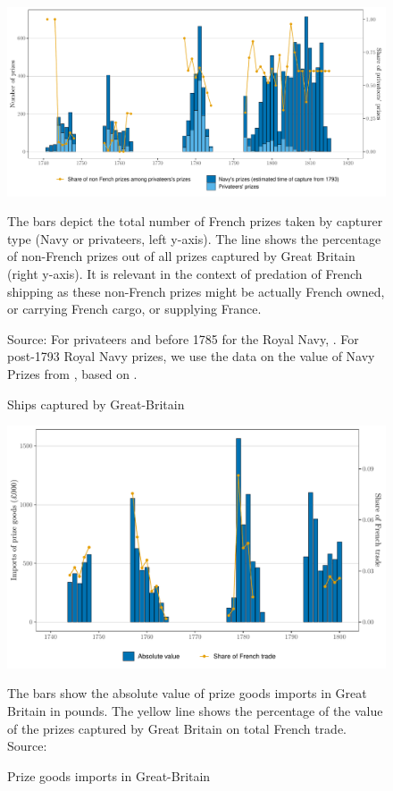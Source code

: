 \documentclass[12pt,a4paper,notitlepage,english]{article}
\newcommand{\fontsmall}{\fontsize{10pt}{12pt}\selectfont}
\newcommand{\source}[1]{\caption*{\footnotesize Source: {#1}} }
\begin{document}
\begin{appendix}
\begin{figure}[h!]
\caption{Ships captured by Great-Britain}
\label{Prizes}
\centering
\includegraphics[scale=0.2]{Prizes}
\begin{minipage}{18cm}
\begin{flushleft}
\fontsmall 
The bars depict the total number of French prizes taken by capturer type (Navy or privateers, left y-axis). The line shows the percentage of non-French prizes out of all prizes captured by Great Britain (right y-axis). It is relevant in the context of predation of French shipping as these non-French prizes might be actually French owned, or carrying French cargo, or supplying France. 
\source{For privateers and before 1785 for the Royal Navy, \cite{Starkey1990,Hillmann2011}. For post-1793 Royal Navy prizes, we use the data on the value of Navy Prizes from \cite{Benjamin2009}, based on \cite{Hill1998}.}
\end{flushleft}
\end{minipage}
\end{figure}

\begin{figure}[h!]
\caption{Prize goods imports in Great-Britain}
\label{Prize goods imports}
\centering
\includegraphics[scale=0.2]{Prizes_imports}
\begin{minipage}{18cm}
\begin{flushleft}
\fontsmall 
The bars show the absolute value of prize goods imports in Great Britain in pounds. The yellow line shows the percentage of the value of the prizes captured by Great Britain on total French trade. Source: 
\cite{Ashton1960}
\end{flushleft}
\end{minipage}
\end{figure}


\end{appendix}
\end{document}
